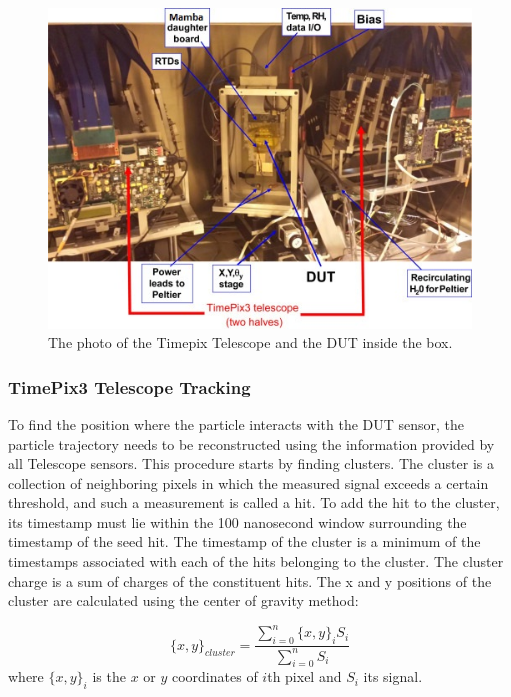 \begin{figure}[!h]
\centering
\hspace*{-1cm}\includegraphics{figures/telescope_photo.jpg}
\caption{The photo of the Timepix Telescope and the DUT inside the box. }
\label{fig:telescope_photo}
\end{figure}

\subsubsection{TimePix3 Telescope Tracking}

To find the position where the particle interacts with the DUT sensor, the particle trajectory needs to be reconstructed using the information provided by all Telescope sensors. This procedure starts by finding clusters. The cluster is a collection of neighboring pixels in which the measured signal exceeds a certain threshold, and such a measurement is called a hit. To add the hit to the cluster, its timestamp must lie within the 100 nanosecond window surrounding the timestamp of the seed hit. The timestamp of the cluster is a minimum of the timestamps associated with each of the hits belonging to the cluster. The cluster charge is a sum of charges of the constituent hits. 
The x and y positions of the cluster are calculated using the center of gravity method: 

\begin{equation}
    \{x,y\}_{cluster} = \frac{\sum_{i = 0}^{n} \{x,y\}_{i} S_{i}}{\sum_{i = 0}^{n} S_{i}} 
\end{equation}
where $\{x,y\}_{i} $ is the $x$ or $y$  coordinates of $i$th pixel and $S_i$ its signal. 


